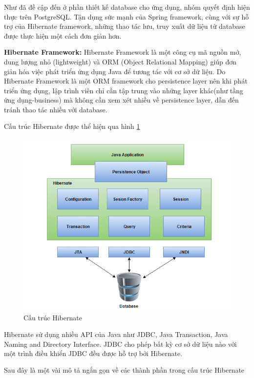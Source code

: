 \documentclass[11pt,a4paper,oneside]{book}
\begin{document}
Như đã đề cập đến ở phần thiết kế database cho ứng dụng, nhóm quyết định hiện thực trên PostgreSQL. Tận dụng sức mạnh của Spring framework, cùng với sự hỗ trợ của Hibernate framework, những thao tác lưu, truy xuất dữ liệu từ database được thực hiện một cách đơn giản hơn.

\textbf{Hibernate Framework:} Hibernate Framework là một công cụ mã nguồn mở, dung lượng nhỏ (lightweight) và ORM (Object Relational Mapping) giúp đơn giản hóa việc phát triển ứng dụng Java để tương tác với cơ sở dữ liệu. Do Hibernate Framework là một ORM framework cho persistence layer nên khi phát triển ứng dụng, lập trình viên chỉ cần tập trung vào những layer khác(như tầng ứng dụng-business) mà không cần xem xét nhiều về persistence layer, dẫn đến tránh thao tác nhiều với database.

Cấu trúc Hibernate được thể hiện qua hình \ref{fig:3-hibernate-architecture}

\begin{figure}[h]
  \centering
     \includegraphics[width=12cm]{3-hibernate-architecture}
  \caption{Cấu trúc Hibernate}\label{fig:3-hibernate-architecture}
\end{figure}

Hibernate sử dụng nhiều API của Java như JDBC, Java Transaction, Java Naming and Directory Interface. JDBC cho  phép bất kỳ cơ sở dữ liệu nào với một trình điều khiển JDBC đều được hỗ trợ bởi Hibernate.

Sau đây là một vài mô tả ngắn gọn về các thành phần trong cấu trúc Hibernate
\end{document}
